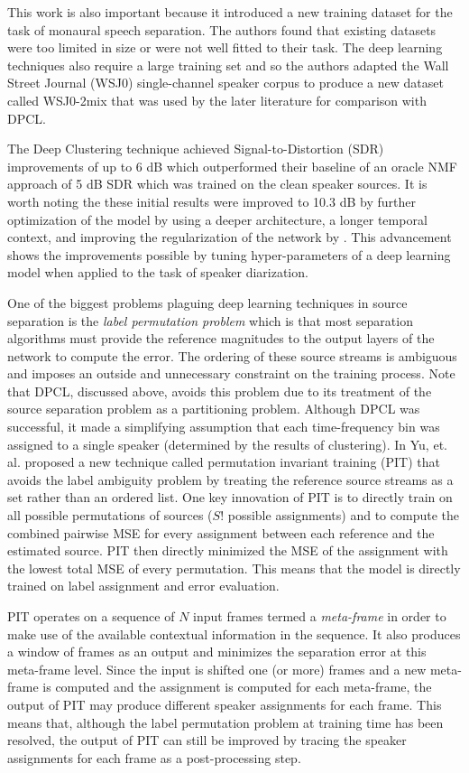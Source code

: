\documentclass[journal, a4paper]{IEEEtran}
\begin{document}
This work is also important because it introduced a new training dataset for the task of monaural speech separation. The authors found that existing datasets were too limited in size or were not well fitted to their task. The deep learning techniques also require a large training set and so the authors adapted the Wall Street Journal (WSJ0) \cite{garofolo:wsj0} single-channel speaker corpus to produce a new dataset called WSJ0-2mix \cite{WSJmix} that was used by the later literature for comparison with DPCL.

The Deep Clustering technique achieved Signal-to-Distortion (SDR) improvements of up to 6 dB which outperformed their baseline of an oracle NMF approach of 5 dB SDR which was trained on the clean speaker sources. It is worth noting the these initial results were improved to 10.3 dB by further optimization of the model by using a deeper architecture, a longer temporal context, and improving the regularization of the network by \cite{DBLP:journals/corr/IsikRCWH16}. This advancement shows the improvements possible by tuning hyper-parameters of a deep learning model when applied to the task of speaker diarization.

One of the biggest problems plaguing deep learning techniques in source separation is the \textit{label permutation problem} which is that most separation algorithms must provide the reference magnitudes to the output layers of the network to compute the error. The ordering of these source streams is ambiguous and imposes an outside and unnecessary constraint on the training process. Note that DPCL, discussed above, avoids this problem due to its treatment of the source separation problem as a partitioning problem. Although DPCL was successful, it made a simplifying assumption that each time-frequency bin was assigned to a single speaker (determined by the results of clustering). In \cite{DBLP:journals/corr/YuKTJ16} Yu, et. al. proposed a new technique called permutation invariant training (PIT) that avoids the label ambiguity problem by treating the reference source streams as a set rather than an ordered list. One key innovation of PIT is to directly train on all possible permutations of sources ($S!$ possible assignments) and to compute the combined pairwise MSE for every assignment between each reference and the estimated source. PIT then directly minimized the MSE of the assignment with the lowest total MSE of every permutation. This means that the model is directly trained on label assignment and error evaluation.

PIT operates on a sequence of $N$ input frames termed a \textit{meta-frame} in order to make use of the available contextual information in the sequence. It also produces a window of frames as an output and minimizes the separation error at this meta-frame level. Since the input is shifted one (or more) frames and a new meta-frame is computed and the assignment is computed for each meta-frame, the output of PIT may produce different speaker assignments for each frame. This means that, although the label permutation problem at training time has been resolved, the output of PIT can still be improved by tracing the speaker assignments for each frame as a post-processing step.
\end{document}
